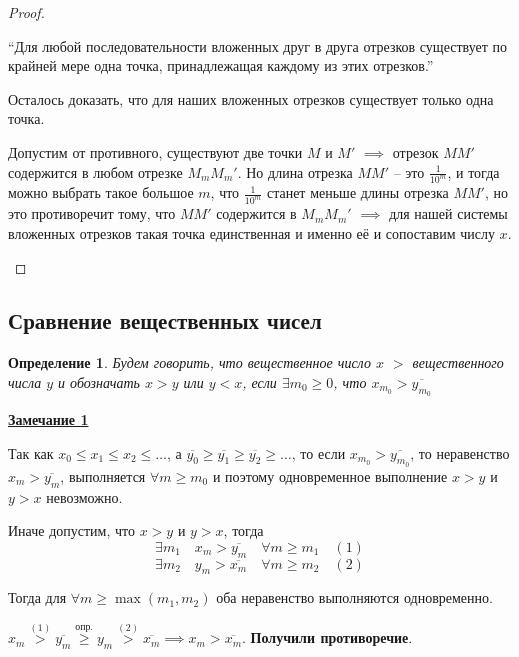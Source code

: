 \documentclass[a4paper,oneside]{article}
\newcommand{\parspace}{\vspace{10pt}}
\newtheorem{definition}{Определение}[subsection]
\begin{document}
\begin{proof}
\begin{enumerate}
            ``Для любой последовательности вложенных друг в друга отрезков существует
            по крайней мере одна точка, принадлежащая каждому из этих отрезков.''
            
            Осталось доказать, что для наших вложенных отрезков существует только одна точка.
            
            Допустим от противного, существуют две точки $M$ и $M'$ $\implies$ отрезок
            $MM'$ содержится в любом отрезке $M_mM_m'$. Но длина отрезка $MM'$ -- это
            $\frac{1}{10^m}$, и тогда можно выбрать такое большое $m$, что $\frac{1}{10^m}$
            станет меньше длины отрезка $MM'$, но это противоречит тому, что $MM'$ содержится в
            $M_mM_m'$ $\implies$ для нашей системы вложенных отрезков такая точка единственная и
            именно её и сопоставим числу $x$.
    \end{enumerate}
\end{proof}

\subsection{Сравнение вещественных чисел}

\begin{definition}
    Будем говорить, что вещественное число $x$ $>$ вещественного числа $y$ и обозначать
    $x > y$ или $y < x$, если $\exists m_0 \ge 0$, что $x_{m_0} > \overline{y_{m_0}}$
\end{definition}

\underline{\textbf{Замечание 1}}

Так как $x_0 \le x_1 \le x_2 \le \dots$, 
а $\overline{y_0} \ge \overline{y_1} \ge \overline{y_2} \ge \dots$,
то если $x_{m_0} > \overline{y_{m_0}}$, то неравенство $x_m > \overline{y_m}$,
выполняется $\forall m \ge m_0$ и поэтому одновременное выполнение
$x > y$ и $y > x$ невозможно.

Иначе допустим, что $x > y$ и $y > x$, тогда
\[\exists m_1 \quad x_m > \overline{y_m} \quad \forall m \ge m_1 \quad (1)\]
\[\exists m_2 \quad y_m > \overline{x_m} \quad \forall m \ge m_2 \quad (2)\]

Тогда для $\forall m \ge \max (m_1, m_2)$ оба неравенство выполняются одновременно.

$x_m \stackrel{(1)}{>} \overline{y_m}
\stackrel{\text{опр.}}{\ge} y_m 
\stackrel{(2)}{>} \overline{x_m} \implies x_m > \overline{x_m}$.
\textbf{Получили противоречие}.

\parspace
\end{document}
